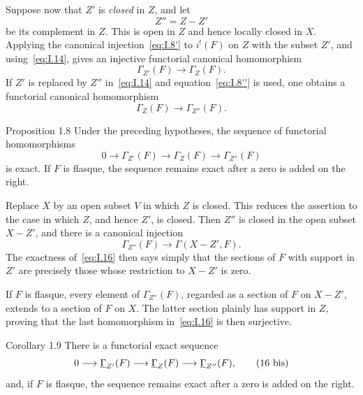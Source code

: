 Suppose now that $Z'$ is \emph{closed} in $Z$, and let
\[
  Z''=Z-Z'
\]
be its complement in $Z$.  This is open in $Z$ and hence locally closed
in $X$.  Applying the canonical injection~\eqref{eq:I.8'} to
$i^!(F)$ on $Z$ with the subset $Z'$, and using~\eqref{eq:I.14}, gives
an injective functorial canonical homomorphism
\begin{equation}
  \Gamma_{Z'}(F)\longrightarrow\Gamma_Z(F).
  \tag{15}\label{eq:I.15}
\end{equation}
If $Z'$ is replaced by $Z''$ in~\eqref{eq:I.14} and
equation~\eqref{eq:I.8''} is used, one obtains a functorial
canonical homomorphism
\begin{equation}
  \Gamma_Z(F)\longrightarrow\Gamma_{Z''}(F).
  \tag{$15'$}\label{eq:I.15'}
\end{equation}

\begin{sgastatement}{Proposition 1.8}
Under the preceding hypotheses, the sequence of functorial
homomorphisms
\begin{equation}
  0\longrightarrow\Gamma_{Z'}(F)
  \longrightarrow\Gamma_Z(F)
  \longrightarrow\Gamma_{Z''}(F)
  \tag{16}\label{eq:I.16}
\end{equation}
is exact.  If $F$ is flasque, the sequence remains exact after a zero is
added on the right.
\end{sgastatement}

\begin{sgaproof}
Replace $X$ by an open subset $V$ in which $Z$ is closed.  This reduces
the assertion to the case in which $Z$, and hence $Z'$, is closed.
Then $Z''$ is closed in the open subset $X-Z'$, and there is a canonical
injection
\[
  \Gamma_{Z''}(F)\longrightarrow\Gamma(X-Z',F).
\]
The exactness of~\eqref{eq:I.16} then says simply that the sections of
$F$ with support in $Z'$ are precisely those whose restriction to
$X-Z'$ is zero.

If $F$ is flasque, every element of $\Gamma_{Z''}(F)$, regarded as a
section of $F$ on $X-Z'$, extends to a section of $F$ on $X$.  The
latter section plainly has support in $Z$, proving that the last
homomorphism in~\eqref{eq:I.16} is then surjective.
\end{sgaproof}

\begin{sgastatement}{Corollary 1.9}
There is a functorial exact sequence
\begin{equation}
  0\longrightarrow\mathop{\underline{\Gamma}}\nolimits_{Z'}(F)
  \longrightarrow\mathop{\underline{\Gamma}}\nolimits_Z(F)
  \longrightarrow\mathop{\underline{\Gamma}}\nolimits_{Z''}(F),
  \tag{16 bis}\label{eq:I.16bis}
\end{equation}
and, if $F$ is flasque, the sequence remains exact after a zero is added
on the right.
\end{sgastatement}


